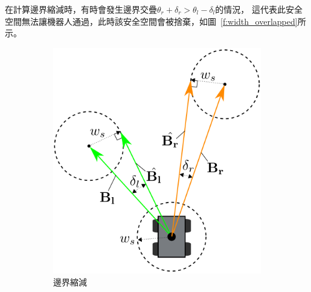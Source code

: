 在計算邊界縮減時，有時會發生邊界交疊$\theta_r + \delta_r > \theta_l - \delta_l$的情況，
這代表此安全空間無法讓機器人通過，此時該安全空間會被捨棄，如圖~\ref{f:width_overlapped}所示。
\begin{figure}[h!]
	\centering
	\begin{subfigure}[t]{0.5\textwidth}
		\includegraphics[width=\textwidth]{figures/width}
		\caption{邊界縮減}
		\label{f:width}
	\end{subfigure}
	~
	\begin{subfigure}[t]{0.32\textwidth}

\end{subfigure}
\end{figure}
